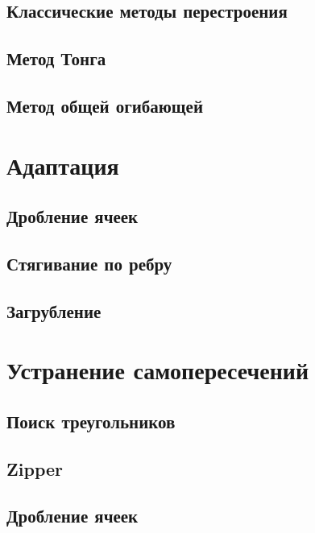 \documentclass[
11pt,%
tightenlines,%
twoside,%
onecolumn,%
nofloats,%
nobibnotes,%
nofootinbib,%
superscriptaddress,%
noshowpacs,%
centertags]%
{revtex4}
\begin{document}
\subsection{Классические методы перестроения}

\subsection{Метод Тонга}

\subsection{Метод общей огибающей}



\section{Адаптация}
\subsection{Дробление ячеек}

\subsection{Стягивание по ребру}

\subsection{Загрубление}



\section{Устранение самопересечений}
\subsection{Поиск треугольников}

\subsection{Zipper}

\subsection{Дробление ячеек}

\end{document}
